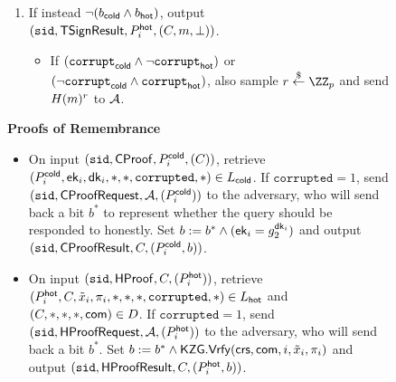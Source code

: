 \begin{savenotes}
\begin{figure*}
{{\begin{itemize}
\begin{enumerate}
            \begin{itemize}
                \item If $(\texttt{corrupt}_\cold \land \neg \texttt{corrupt}_\hot)$, also send $\sigma_i^\hot$ to $\adv$. If $(\neg \texttt{corrupt}_\cold \land \texttt{corrupt}_\hot)$, send $\sigma_i^\cold$ to $\adv$.
                \item Additionally, for every party $P_j^\hot$ such that $(P_j^\hot, *) \in \mathcal{I}$, retrieve $(P_j^\hot, *, \texttt{allowc}) \in \hotstates$ and set $\texttt{allowc}$ to 0.
            \end{itemize}
            \item If instead $\neg (b_{\mathsf{cold}} \land b_{\mathsf{hot}})$, output $(\texttt{sid}, \mathsf{TSignResult}, P_i^{\mathsf{hot}}, (C, m, \perp))$.
            \begin{itemize}
                \item If $(\texttt{corrupt}_\cold \land \neg \texttt{corrupt}_\hot)$ or $(\neg \texttt{corrupt}_\cold \land \texttt{corrupt}_\hot)$, also sample $r \sample \ZZ_p$ and send $H(m)^r$ to $\adv$.
            \end{itemize}
        \end{enumerate}
    
    \end{itemize}
    
    \textbf{Proofs of Remembrance}
    \begin{itemize}
        \item On input $(\texttt{sid},\mathsf{CProof}, P_i^{\mathsf{cold}}, (C))$, retrieve $(P_i^{\mathsf{cold}}, \mathsf{ek}_i, \mathsf{dk}_i, *, *, \texttt{corrupted}, *) \in L_{\mathsf{cold}}$.
        If $\texttt{corrupted} = 1$, send $(\texttt{sid}, \mathsf{CProofRequest}, \mathcal{A}, (P_i^{\mathsf{cold}}))$ to the adversary, who will send back a bit $b^*$ to represent whether the query should be responded to honestly. Set $b := b^* \land (\mathsf{ek}_i = g_2^{\mathsf{dk}_i})$ and
        output $(\texttt{sid}, \mathsf{CProofResult}, C, (P_i^{\mathsf{cold}}, b))$.
    
        \item On input $(\texttt{sid},\mathsf{HProof}, C, (P_i^{\mathsf{hot}}))$, retrieve $(P_i^{\mathsf{hot}}, C, \tilde{x}_i, \pi_i, *, *, *, \texttt{corrupted}, *) \in L_{\mathsf{hot}}$ and $(C, *, *, *, \mathsf{com}) \in D$. %
        If $\texttt{corrupted} = 1$, send $(\texttt{sid}, \mathsf{HProofRequest}, \mathcal{A}, (P_i^{\mathsf{hot}}))$ to the adversary, who will send back a bit $b^*$. Set $b := b^* \land \mathsf{KZG}.\mathsf{Vrfy}(\mathsf{crs}, \mathsf{com}, i, \tilde{x}_i, \pi_i)$ and
        output $(\texttt{sid}, \mathsf{HProofResult}, C, (P_i^{\mathsf{hot}}, b))$.
    \end{itemize}
    
}}
\end{figure*}
\end{savenotes}
